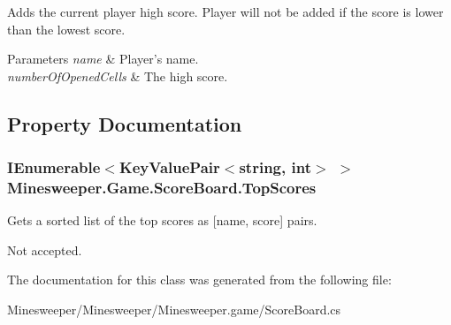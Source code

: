 Adds the current player high score. Player will not be added if the score is lower than the lowest score. 


\begin{DoxyParams}{Parameters}
{\em name} & Player's name.\\
\hline
{\em number\+Of\+Opened\+Cells} & The high score.\\
\hline
\end{DoxyParams}


\subsection{Property Documentation}
\hypertarget{class_minesweeper_1_1_game_1_1_score_board_a009d2aa35647d16eb0b6aa89943d01ac}{
\subsubsection[{Top\+Scores}]{\setlength{\rightskip}{0pt plus 5cm}I\+Enumerable$<$Key\+Value\+Pair$<$string, int$>$ $>$ Minesweeper.\+Game.\+Score\+Board.\+Top\+Scores\hspace{0.3cm}{\ttfamily [get]}}}\label{class_minesweeper_1_1_game_1_1_score_board_a009d2aa35647d16eb0b6aa89943d01ac}


Gets a sorted list of the top scores as \mbox{[}name, score\mbox{]} pairs. 

Not accepted.

The documentation for this class was generated from the following file\+:\begin{DoxyCompactItemize}
\item 
Minesweeper/\+Minesweeper/\+Minesweeper.\+game/Score\+Board.\+cs\end{DoxyCompactItemize}
